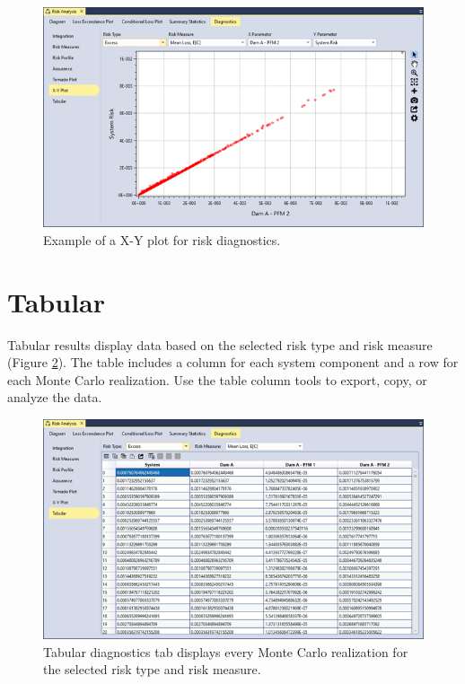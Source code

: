 \documentclass[
]{book}
\begin{document}
\begin{figure}

{\centering \includegraphics{images/figure152} 

}

\caption{Example of a X-Y plot for risk diagnostics.}\label{fig:figure-152}
\end{figure}

\hypertarget{tabular}{%
\section{Tabular}\label{tabular}}

Tabular results display data based on the selected risk type and risk measure (Figure \ref{fig:figure-153}). The table includes a column for each system component and a row for each Monte Carlo realization. Use the table column tools to export, copy, or analyze the data.

\begin{figure}

{\centering \includegraphics{images/figure153} 

}

\caption{Tabular diagnostics tab displays every Monte Carlo realization for the selected risk type and risk measure.}\label{fig:figure-153}
\end{figure}
\end{document}
